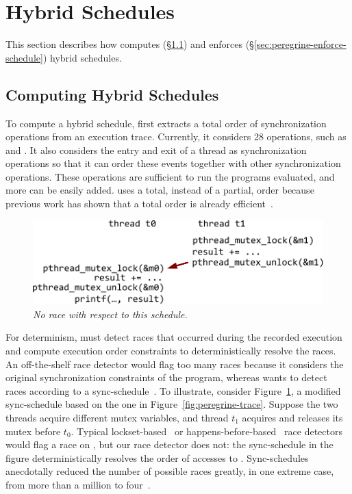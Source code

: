 \section{Hybrid Schedules} \label{sec:peregrine-schedule}

This section describes how \peregrine computes (\S\ref{sec:peregrine-compute-schedule})
and enforces (\S\ref{sec:peregrine-enforce-schedule}) hybrid schedules.

\subsection{Computing Hybrid Schedules} \label{sec:peregrine-compute-schedule}

To compute a hybrid schedule, \peregrine first extracts a total order of
synchronization operations from an execution trace.  Currently, it
considers 28  operations, such as 
and .  It also considers
the entry and exit of a thread as synchronization operations so that it can
order these events together with other synchronization operations.  These
operations are sufficient to run the programs evaluated, and more can be
easily added.  \peregrine uses a total, instead of a partial, order because
previous work has shown that a total order is already
efficient~\cite{cui:tern:osdi10,kendo:asplos09}.

\begin{figure}[t]
\centering
\includegraphics[width=.65\columnwidth]{peregrine/figures/concurrent-intervals}
\caption{{\em No \peregrine race with respect to this
    schedule.}} \label{fig:peregrine-concurrent-intervals}
\end{figure}

For determinism, \peregrine must detect races that occurred during the recorded
execution and compute execution order constraints to deterministically
resolve the races.  An off-the-shelf race detector would flag too many
races because it considers the original synchronization
constraints of the program, whereas \peregrine wants to detect races according
to a sync-schedule~\cite{pres:sosp09,recplay:tocs}.  To illustrate,
consider Figure~\ref{fig:peregrine-concurrent-intervals}, a modified sync-schedule
based on the one in Figure~\ref{fig:peregrine-trace}.  Suppose the two threads
acquire different mutex variables, and thread $t_1$ acquires and releases
its mutex before $t_0$.  Typical lockset-based~\cite{savage:eraser}
or happens-before-based~\cite{lamportclock} race detectors would flag a
race on , but our race detector does not: the sync-schedule
in the figure deterministically resolves the order of accesses to .  
Sync-schedules anecdotally reduced the number of
possible races greatly, in one extreme case, from more than a million to
four~\cite{pres:sosp09}.


